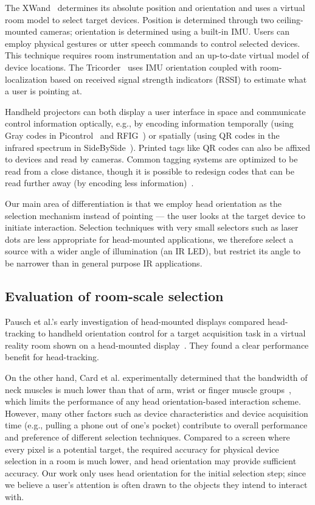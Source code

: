 The XWand~\cite{wilson_xwand:_2003} determines its absolute position and orientation and uses a virtual room model to select target devices. Position is determined through two ceiling-mounted cameras; orientation is determined using a built-in IMU. Users can employ physical gestures or utter speech commands to control selected devices. This technique requires room instrumentation and an up-to-date virtual model of device locations. The Tricorder~\cite{lifton_tricorder:_2007} uses IMU orientation coupled with room-localization based on received signal strength indicators (RSSI) to estimate what a user is pointing at.

Handheld projectors can both display a user interface in space and communicate control information optically, e.g., by encoding information temporally (using Gray codes in Picontrol~\cite{schmidt_picontrol:_2012} and RFIG~\cite{raskar_rfig_2004}) or spatially (using QR codes in the infrared spectrum in SideBySide~\cite{willis_sidebyside:_2011}). Printed tags like QR codes can also be affixed to devices and read by cameras. Common tagging systems are optimized to be read from a close distance, though it is possible to redesign codes that can be read further away (by encoding less information)~\cite{cross_low-cost_2012}. 

Our main area of differentiation is that we employ head orientation as the selection mechanism instead of pointing --- the user looks at the target device to initiate interaction. Selection techniques with very small selectors such as laser dots are less appropriate for head-mounted applications, we therefore select a source with a wider angle of illumination (an IR LED), but restrict its angle to be narrower than in general purpose IR applications.

\subsection{Evaluation of room-scale selection}
Pausch et al.'s early investigation of head-mounted displays compared head-tracking to handheld orientation control for a target acquisition task in a virtual reality room shown on a head-mounted display~\cite{pausch_user_1993}. They found a clear performance benefit for head-tracking.

On the other hand, Card et al. experimentally determined that the bandwidth of neck muscles is much lower than that of arm, wrist or finger muscle groups~\cite{card_morphological_1991}, which limits the performance of any head orientation-based interaction scheme. However, many other factors such as device characteristics and device acquisition time (e.g., pulling a phone out of one's pocket) contribute to overall performance and preference of different selection techniques.  Compared to a screen where every pixel is a potential target, the required accuracy for physical device selection in a room is much lower, and head orientation may provide sufficient accuracy. Our work only uses head orientation for the initial selection step; since we believe a user's attention is often drawn to the objects they intend to interact with. 

